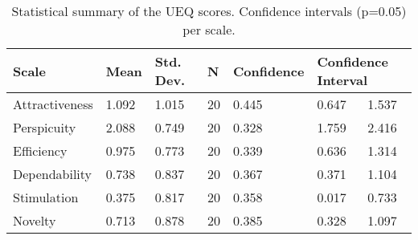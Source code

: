         \begin{table}[t]
                \centering
                \caption{Statistical summary of the \ac{UEQ} scores. Confidence intervals (p=0.05) per scale.}
                \begin{tabular}{p{2cm} p{1cm} p{2cm} p{1cm} p{2cm} p{2cm} p{1.25cm}}
                    \toprule
                    \textbf{Scale}	& \textbf{Mean}	& \textbf{Std. Dev.}	& \textbf{N}	    & \textbf{Confidence}	& \multicolumn{2}{l}{\textbf{Confidence Interval}}\\
                    \midrule
                    Attractiveness	& 1.092	& 1.015	    & 20	& 0.445	        & 0.647	    & 1.537\\
                    Perspicuity	    & 2.088	& 0.749	    & 20	& 0.328	        & 1.759	    & 2.416\\
                    Efficiency	    & 0.975	& 0.773	    & 20	& 0.339	        & 0.636	    & 1.314\\
                    Dependability	& 0.738	& 0.837	    & 20	& 0.367	        & 0.371	    & 1.104\\
                    Stimulation	    & 0.375	& 0.817	    & 20	& 0.358	        & 0.017	    & 0.733\\
                    Novelty	        & 0.713	& 0.878	    & 20	& 0.385	        & 0.328	    & 1.097\\
                    \bottomrule
                \end{tabular}
                \label{tab:ueq_summary}
            \end{table}